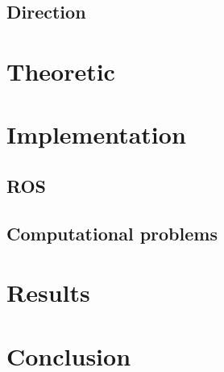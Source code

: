 \documentclass[12pt,fceqn]{report} %
\begin{document}
\section{Direction}


\chapter{Theoretic}

\chapter{Implementation}
\section{ROS}

\section{Computational problems}

\chapter{Results}

\chapter*{Conclusion}
%


\nocite{*}

\end{document}
